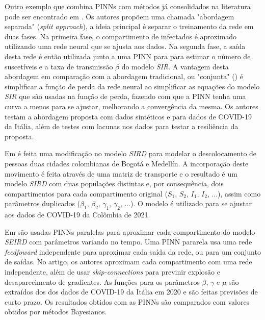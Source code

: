 Outro exemplo que combina PINNs com métodos já consolidados na literatura
pode ser encontrado em \cite{millevoi-etal:24-split-join-pinns}.
Os autores propõem uma chamada "abordagem separada" (\textit{split approach}),
a ideia principal é separar o treinamento da rede em duas fases. Na primeira 
fase, o compartimento de infectados é aproximado utilizando uma rede neural
que se ajusta aos dados. Na segunda fase, a saída desta rede é então utilizada
junto a uma PINN para para estimar o número de suscetíveis e a taxa de transmissão
$\beta$ do modelo \textit{SIR}. A vantagem desta abordagem em comparação com a
abordagem tradicional, ou "conjunta" () é simplificar a 
função de perda da rede neural ao simplificar as equações do modelo \textit{SIR}
que são usadas na função de perda, fazendo com que a PINN tenha uma curva a menos 
para se ajustar, melhorando a convergência da mesma. Os autores
testam a abordagem proposta com dados sintéticos e para dados de COVID-19 da Itália,
além de testes com lacunas nos dados para testar a resiliência da proposta. 

Em \cite{ogueda-oliva:23-colombia-duas-cidades} é feita uma modificação no
modelo \textit{SIRD} para modelar o descolocamento de pessoas duas 
cidades colombianas de Bogotá e Medellín. A incorporação deste movimento 
é feita através de uma matriz de transporte e o resultado é um modelo \textit{SIRD}
com duas populações distintas e, por consequência, dois compartimentos para cada
compartimento original ($S_1$, $S_2$, $I_1$, $I_2$, ...), assim como parâmetros 
duplicados ($\beta_1$, $\beta_2$, $\gamma_1$, $\gamma_2$, ...). O modelo é utilizado
para se ajustar aos dados de COVID-19 da Colômbia de 2021.

Em \cite{ning-etal:23-pinns-paralelas} são usadas PINNs paralelas para aproximar
cada compartimento do modelo \textit{SEIRD} com parâmetros variando no tempo.
Uma PINN pararela usa uma rede \textit{feedfoward} independente para aproximar 
cada saída da rede, ou para um conjunto de saídas. 
No artigo, os autores aproximam cada compartimento com uma rede independente, 
além de usar \textit{skip-connections} para previnir explosão e desaparecimento
de gradientes. 
As funções para os parâmetros $\beta$, $\gamma$ e $\mu$ são extraídos dos dos 
dados de COVID-19 da Itália em 2020 e são feitas previsões de curto prazo.
Os resultados obtidos com as PINNs são comparados com valores obtidos por métodos
Bayesianos. 

